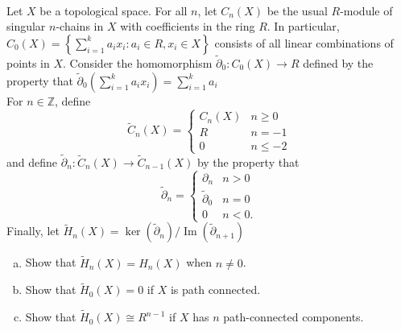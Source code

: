 \documentclass{article}
\newenvironment{problem}[2][Problem]{\begin{trivlist}
\item[\hskip \labelsep {\bfseries #1}\hskip \labelsep {\bfseries #2.}]}{\end{trivlist}}
\newcommand{\fn}[3]{#1 \colon #2 \rightarrow #3}
\newcommand{\set}[1]{\left\{ #1 \right\}}
\DeclareMathOperator{\im}{Im}
\begin{document}
\begin{problem}{2} \text{} \\
  Let $X$ be a topological space. For all $n$, let $C_n(X)$ be the usual
  $R$-module of singular $n$-chains in $X$ with coefficients in the ring $R$.
  In particular, $C_0(X) = \set{\sum_{i=1}^k a_ix_i : a_i \in R, x_i \in X}$
  consists of all linear combinations of points in $X$. Consider the
  homomorphism $\fn{\widetilde \partial_0}{C_0(X)}{R}$ defined by the property
  that $
    \widetilde \partial_0\left(\sum_{i=1}^k a_ix_i\right) = \sum_{i=1}^k a_i
  $
  \\
  For $n \in \mathbb Z$, define \[
    \widetilde C_n(X) = \begin{cases}
      C_n(X) & n \geq 0 \\
      R      & n    = -1 \\
      0      & n \leq -2
    \end{cases}
  \] and define $\fn{\widetilde\partial_n}{\widetilde C_n(X)}{\widetilde C_{n-1}(X)}$ by
  the property that \[
    \widetilde \partial_n = \begin{cases}
      \partial_n        & n > 0 \\
      \widetilde \partial_0 & n = 0 \\
      0                 & n < 0.
    \end{cases}
  \]
  Finally, let $\widetilde H_n(X) = \ker(\widetilde\partial_n)/\im(\widetilde\partial_{n+1})$
  \begin{enumerate}[a.]
    \item Show that $\widetilde H_n(X) = H_n(X)$ when $n \neq 0$.
    \item Show that $\widetilde H_0(X) = 0$ if $X$ is path connected.
    \item Show that $\widetilde H_0(X) \cong R^{n-1}$ if $X$ has $n$
    path-connected components.
  \end{enumerate}
\end{problem}
\end{document}

